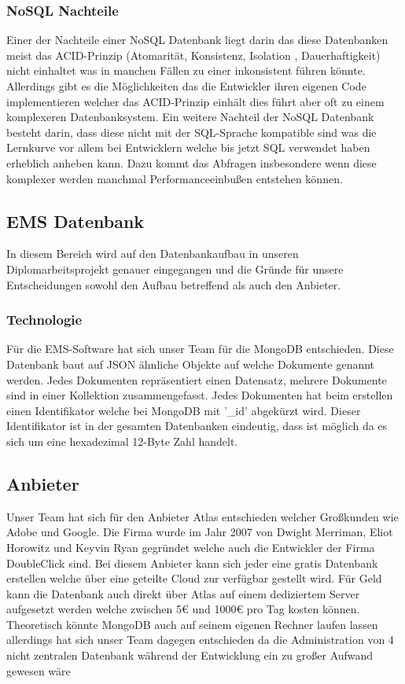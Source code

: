 	\subsubsection{NoSQL Nachteile}
		Einer der Nachteile einer NoSQL Datenbank liegt darin das diese Datenbanken meist das ACID-Prinzip (Atomarität, Konsistenz, Isolation , Dauerhaftigkeit) nicht einhaltet was in manchen Fällen zu einer inkonsistent führen könnte. Allerdings gibt es die Möglichkeiten das die Entwickler ihren eigenen Code implementieren welcher das ACID-Prinzip einhält dies führt aber oft zu einem komplexeren Datenbanksystem. Ein weitere Nachteil der NoSQL Datenbank besteht darin, dass diese nicht mit der SQL-Sprache kompatible sind was die Lernkurve vor allem bei Entwicklern welche bis jetzt SQL verwendet haben erheblich anheben kann. Dazu kommt das Abfragen insbesondere wenn diese komplexer werden manchmal Performanceeinbußen entstehen können.
		
	\subsection{EMS Datenbank}
		In diesem Bereich wird auf den Datenbankaufbau in unseren Diplomarbeitsprojekt genauer eingegangen und die Gründe für unsere Entscheidungen sowohl den Aufbau betreffend als auch den Anbieter.
		
		\subsubsection{Technologie}
			Für die EMS-Software hat sich unser Team für die MongoDB entschieden. Diese Datenbank baut auf JSON ähnliche Objekte auf welche Dokumente genannt werden. Jedes Dokumenten repräsentiert einen Datensatz, mehrere Dokumente sind in einer Kollektion zusammengefasst. Jedes Dokumenten hat beim erstellen einen Identifikator welche bei MongoDB mit '\_id' abgekürzt wird. Dieser Identifikator ist in der gesamten Datenbanken eindeutig, dass ist möglich da es sich um eine hexadezimal 12-Byte Zahl handelt. 
		
		\subsection{Anbieter}
			Unser Team hat sich für den Anbieter Atlas entschieden welcher Großkunden wie Adobe und Google. Die Firma wurde im Jahr 2007 von Dwight Merriman, Eliot Horowitz und Keyvin Ryan gegründet welche auch die Entwickler der Firma DoubleClick sind. Bei diesem Anbieter kann sich jeder eine gratis Datenbank erstellen welche über eine geteilte Cloud zur verfügbar gestellt wird. Für Geld kann die Datenbank auch direkt über Atlas auf einem dediziertem Server aufgesetzt werden welche zwischen 5€ und 1000€ pro Tag kosten können. Theoretisch könnte MongoDB auch auf seinem eigenen Rechner laufen lassen allerdings hat sich unser Team dagegen entschieden da die Administration von 4 nicht zentralen Datenbank während der Entwicklung ein zu großer Aufwand gewesen wäre
		
